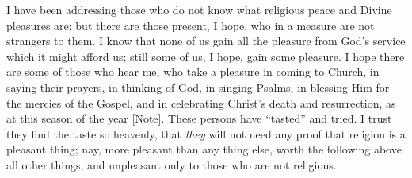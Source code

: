 I have been addressing those who do not know what
religious peace and Divine pleasures are; but there are
those present, I hope, who in a measure are not strangers
to them. I know that none of us gain all the pleasure
from God's service which it might afford us; still some
of us, I hope, gain some pleasure. I hope there are some
of those who hear me, who take a pleasure in coming to
Church, in saying their prayers, in thinking of God, in
singing Psalms, in blessing Him for the mercies of the
Gospel, and in celebrating Christ's death and
resurrection, as at this season of the year [Note].
These persons have ``tasted'' and tried. I trust
they find the taste so heavenly, that \emph{they} will
not need any proof that religion is a pleasant thing;
nay, more pleasant than any thing else, worth the
following above all other things, and unpleasant only to
those who are not religious.

